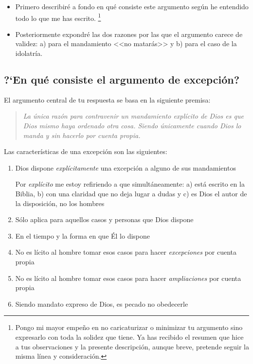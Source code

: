 \documentclass{article}
\begin{document}
\begin{itemize}
\item Primero describir\'e a fondo en qu\'e consiste este argumento seg\'un he entendido todo lo que me has escrito.%
    \footnote{Pongo mi mayor empe\~no en no caricaturizar o minimizar tu argumento sino expresarlo con toda la solidez que tiene. Ya has recibido el resumen que hice a tus observaciones y la presente descripci\'on, aunque breve, pretende seguir la misma l\'{i}nea y consideraci\'on.}
\item Posteriormente expondr\'e las dos razones por las que el argumento carece de validez: a) para el mandamiento <<no matar\'as>> y b) para el caso de la idolatr\'{i}a.
\end{itemize}

\subsection{?`En qu\'e consiste el argumento de excepci\'on?}

El argumento central de tu respuesta se basa en la siguiente premisa:

\begin{quote}
\emph{La \'unica raz\'on para contravenir un mandamiento expl\'{i}cito de Dios es que Dios mismo haya ordenado otra cosa. Siendo \'unicamente cuando Dios lo manda y sin hacerlo por cuenta propia.}
\end{quote}

\noindent
Las caracter\'{i}sticas de una excepci\'on son las siguientes:

\begin{enumerate}
\item Dios dispone \emph{expl\'{i}citamente} una excepci\'on a alguno de sus mandamientos
    
    Por \emph{expl\'{i}cito} me estoy refiriendo a que simult\'aneamente: a) est\'a escrito en la Biblia, b) con una claridad que no deja lugar a dudas y c) es Dios el autor de la disposici\'on, no los hombres

\item S\'olo aplica para aquellos casos y personas que Dios dispone
\item En el tiempo y la forma en que \'El lo dispone
\item No es l\'{i}cito al hombre tomar esos casos para hacer \emph{excepciones} por cuenta propia
\item No es l\'{i}cito al hombre tomar esos casos para hacer \emph{ampliaciones} por cuenta propia
\item Siendo mandato expreso de Dios, es pecado no obedecerle
\end{enumerate}
\end{document}
